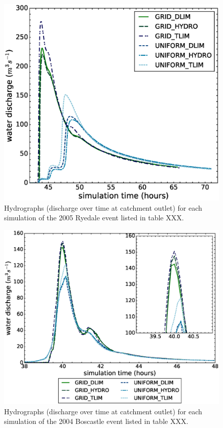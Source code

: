 \begin{figure}[t]
\includegraphics[width=14cm]{chp06_figures_scripts/figure_ryedale_hydrograph_ensemble.eps}
\caption{Hydrographs (discharge over time at catchment outlet) for each simulation of the 2005 Ryedale event listed in table XXX.}
\label{fig_ryedale_hydrograph_ensemble}
\end{figure}

\begin{figure}[t]
\includegraphics[width=14cm]{chp06_figures_scripts/figure_boscastle_hydrograph_ensemble.eps}
\caption{Hydrographs (discharge over time at catchment outlet) for each simulation of the 2004 Boscastle event listed in table XXX.}
\label{fig_boscastle_hydrograph_ensemble}
\end{figure}

